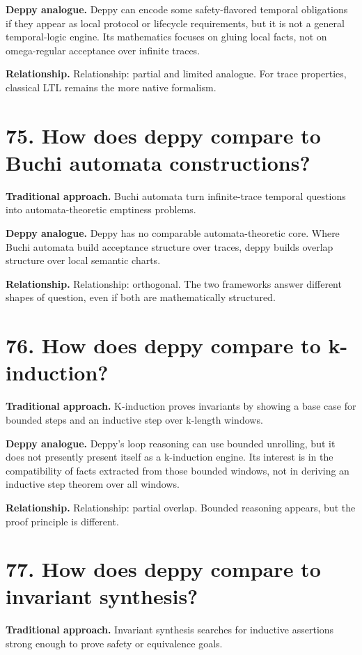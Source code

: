 \documentclass[11pt,openany]{book}
\begin{document}
\textbf{Deppy analogue.} Deppy can encode some safety-flavored temporal obligations if they appear as local protocol or lifecycle requirements, but it is not a general temporal-logic engine. Its mathematics focuses on gluing local facts, not on omega-regular acceptance over infinite traces.

\textbf{Relationship.} Relationship: partial and limited analogue. For trace properties, classical LTL remains the more native formalism.

\section*{75. How does deppy compare to Buchi automata constructions?}
\textbf{Traditional approach.} Buchi automata turn infinite-trace temporal questions into automata-theoretic emptiness problems.

\textbf{Deppy analogue.} Deppy has no comparable automata-theoretic core. Where Buchi automata build acceptance structure over traces, deppy builds overlap structure over local semantic charts.

\textbf{Relationship.} Relationship: orthogonal. The two frameworks answer different shapes of question, even if both are mathematically structured.

\section*{76. How does deppy compare to k-induction?}
\textbf{Traditional approach.} K-induction proves invariants by showing a base case for bounded steps and an inductive step over k-length windows.

\textbf{Deppy analogue.} Deppy's loop reasoning can use bounded unrolling, but it does not presently present itself as a k-induction engine. Its interest is in the compatibility of facts extracted from those bounded windows, not in deriving an inductive step theorem over all windows.

\textbf{Relationship.} Relationship: partial overlap. Bounded reasoning appears, but the proof principle is different.

\section*{77. How does deppy compare to invariant synthesis?}
\textbf{Traditional approach.} Invariant synthesis searches for inductive assertions strong enough to prove safety or equivalence goals.
\end{document}
